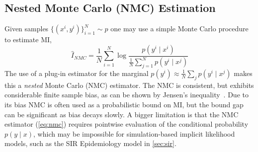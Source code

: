 \subsection{Nested Monte Carlo (NMC) Estimation}\label{sec:nmc}

Given samples $\{(x^i,y^i)\}_{i=1}^N \sim p$ one may use a simple
Monte Carlo procedure to estimate MI,
\begin{equation}\label{eq:nmc}
  \hat{I}_{NMC} = \frac{1}{N} \sum_{i=1}^N \log \frac{ p(y^i \mid x^i)
  }{ \frac{1}{N} \sum_{j=1}^N p(y^i \mid x^j) }
\end{equation}
The use of a plug-in estimator for the marginal
$p(y^i) \approx \frac{1}{N} \sum_j p(y^i \mid x^j)$ makes this a
\emph{nested} Monte Carlo (NMC) estimator.  The NMC is consistent, but
exhibits considerable finite sample bias, as can be shown by Jensen's
inequality~\cite{zheng2018robust, rainforth2018nesting}.  Due to its
bias NMC is often used as a probabilistic bound on MI, but the bound
gap can be significant as bias decays slowly.
A bigger limitation is that the NMC estimator (\EQN\eqref{eq:nmc})
requires pointwise evaluation of the conditional probability $p(y \mid
x)$, which may be impossible for simulation-based implicit likelihood
models, such as the SIR Epidemiology model in \SEC\ref{sec:sir}.





